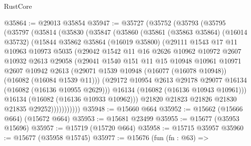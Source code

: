 \begin{lexlean}{RustCore}
\begin{coremodule}
@35864 := @29013 @35854
@35947 := @35727
    (@35752
      (@35793
        (@35795
          (@35797
            (@35814
              (@35830
                (@35847
                  (@35860
                    (@35861
                      (@35863 @35864)
                      (@16014 @35732)
                      (@15844
                        @35862
                        @35864
                        (@16019 @35800)
                        (@29111
                          @1543
                          @17
                          @11
                          @10963
                          @10973
                          @5035
                          (@29042
                            @1542
                            @11
                            @16
                            @2626
                            @10962
                            @10972
                            @2607
                            @10932
                            @2613
                            @29058
                            (@29041
                              @1540
                              @151
                              @11
                              @15
                              @10948
                              @10961
                              @10971
                              @2607
                              @10942
                              @2613
                              (@29071
                                @1539
                                @10948
                                (@16077 (@16078 @10948))
                                (@16082 (@16084 @1539 @11)))
                              (@29172
                                @10954
                                @2613
                                @29178
                                @29077
                                @16134
                                (@16082 (@16136 @10955 @2629)))
                              @16134
                              (@16082 (@16136 @10943 @10961)))
                            @16134
                            (@16082 (@16136 @10933 @10962)))
                          @21820
                          @21823
                          @21826
                          @21830
                          @21835
                          @29252)))))))))))
@35948 := @15660 @664
@35952 := @15662 (@15666 @664) (@15672 @664)
@35953 := @15681 @23499
@35955 := @15677 (@35953 @15696)
@35957 := @15719 (@15720 @664)
@35958 := @15715 @35957
@35960 := @15677 (@35958 @15745)
@35977 := @15676
    (fun (fn : @63) =>

\end{coremodule}
\end{lexlean}
